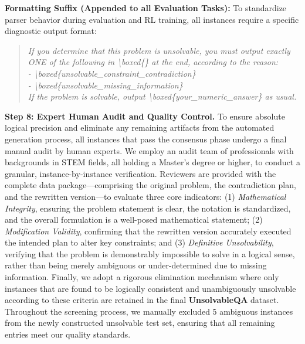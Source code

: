 \textbf{Formatting Suffix (Appended to all Evaluation Tasks):}
To standardize parser behavior during evaluation and RL training, all instances require a specific diagnostic output format:
\begin{quote}\small\itshape
If you determine that this problem is unsolvable, you must output exactly ONE of the following in \textbackslash{}boxed\{\} at the end, according to the reason: \\
- \textbackslash{}boxed\{unsolvable\_constraint\_contradiction\} \\
- \textbackslash{}boxed\{unsolvable\_missing\_information\} \\
If the problem is solvable, output \textbackslash{}boxed\{your\_numeric\_answer\} as usual.
\end{quote}

\textbf{Step 8: Expert Human Audit and Quality Control.} To ensure absolute logical precision and eliminate any remaining artifacts from the automated generation process, all instances that pass the consensus phase undergo a final manual audit by human experts. We employ an audit team of professionals with backgrounds in STEM fields, all holding a Master’s degree or higher, to conduct a granular, instance-by-instance verification. Reviewers are provided with the complete data package—comprising the original problem, the contradiction plan, and the rewritten version—to evaluate three core indicators: (1) \textit{Mathematical Integrity}, ensuring the problem statement is clear, the notation is standardized, and the overall formulation is a well-posed mathematical statement; (2) \textit{Modification Validity}, confirming that the rewritten version accurately executed the intended plan to alter key constraints; and (3) \textit{Definitive Unsolvability}, verifying that the problem is demonstrably impossible to solve in a logical sense, rather than being merely ambiguous or under-determined due to missing information. Finally, we adopt a rigorous elimination mechanism where only instances that are found to be logically consistent and unambiguously unsolvable according to these criteria are retained in the final \textbf{UnsolvableQA} dataset. Throughout the screening process, we manually excluded 5 ambiguous instances from the newly constructed unsolvable test set, ensuring that all remaining entries meet our quality standards.

